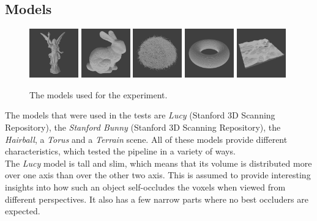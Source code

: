 \subsection*{Models} \label{subsec-models}

\begin{figure}[h]
  \centering
  \includegraphics[width=80px]{images/graphics/model-lucy.jpg}
  \includegraphics[width=80px]{images/graphics/model-bunny.jpg}
  \includegraphics[width=80px]{images/graphics/model-hairball.jpg}
  \includegraphics[width=80px]{images/graphics/model-torus.jpg}
  \includegraphics[width=80px]{images/graphics/model-terrain.jpg}
  \caption{The models used for the experiment.}
  \label{fig:experiment-models}
\end{figure}

\noindent
The models that were used in the tests are \emph{Lucy} (Stanford 3D Scanning Repository), the \emph{Stanford Bunny} 
(Stanford 3D Scanning Repository), the \emph{Hairball}, a \emph{Torus} and a \emph{Terrain} scene. All of 
these models provide different characteristics, which tested the pipeline in a variety of ways. \\

\noindent
The \emph{Lucy} model is tall and slim, which means that its volume is distributed more over one axis 
than over the other two axis. This is assumed to provide interesting insights into how such an object 
self-occludes the voxels when viewed from different perspectives. It also has a few narrow parts where 
no best occluders are expected. \\

